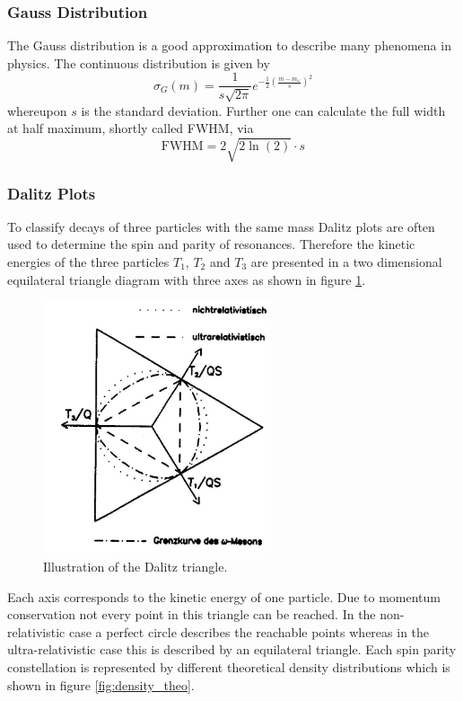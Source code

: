 \documentclass[10pt, a4paper, notitlepage, DIV=15]{scrartcl}
\begin{document}
\subsubsection{Gauss Distribution}
The Gauss distribution is a good approximation to describe many phenomena in physics. The continuous distribution is given by \cite{gauss}
\begin{equation}\label{eq:gauss}
	\sigma_G(m)=\frac{1}{s\sqrt{2\pi}}e^{-\frac{1}{2}\left( \frac{m-m_\omega}{s}\right)^2} 
\end{equation} 
whereupon $s$ is the standard deviation. Further one can calculate the full width at half maximum, shortly called FWHM, via 
\begin{equation}\label{eq:calc_fwhm}
	\text{FWHM}=2\sqrt{2\ln(2)}\cdot s
\end{equation}
\subsubsection{Dalitz Plots}
To classify decays of three particles with the same mass Dalitz plots are often used to determine the spin and parity of resonances. Therefore the kinetic energies of the three particles $T_1$, $T_2$ and $T_3$ are presented in a two dimensional equilateral triangle diagram with three axes as shown in figure \ref{fig:dalitz}.
\begin{figure}[h]
	\centering
	\includegraphics[width=0.6\textwidth]{Dalitz-triangle}
	\caption{Illustration of the Dalitz triangle. \cite{description}}
	\label{fig:dalitz}
\end{figure}
Each axis corresponds to the kinetic energy of one particle. Due to momentum conservation not every point in this triangle can be reached. In the non-relativistic case a perfect circle describes the reachable points whereas in the ultra-relativistic case this is described by an equilateral triangle. Each spin parity constellation is represented by different theoretical density distributions which is shown in figure \ref{fig:density_theo}.
\end{document}
